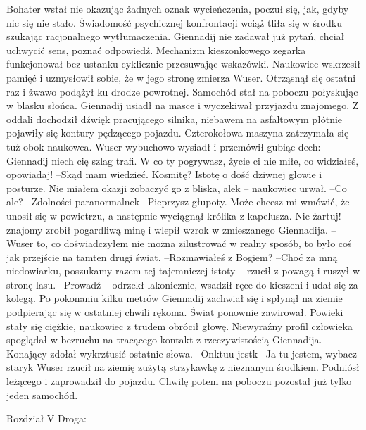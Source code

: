 \documentclass[../MAIN.tex]{subfiles}
\begin{document}
Bohater wstał nie okazując żadnych oznak wycieńczenia, poczuł się, jak, gdyby nic się nie stało. Świadomość psychicznej konfrontacji wciąż tliła się w środku szukając racjonalnego wytłumaczenia. Giennadij nie zadawał już pytań, chciał uchwycić sens, poznać odpowiedź. Mechanizm kieszonkowego zegarka funkcjonował bez ustanku cyklicznie przesuwając wskazówki. Naukowiec wskrzesił pamięć 
i uzmysłowił sobie, że w jego stronę zmierza Wuser. Otrząsnął się ostatni raz i żwawo podążył ku drodze powrotnej. Samochód stał na poboczu połyskując w blasku słońca. Giennadij usiadł na masce i wyczekiwał przyjazdu znajomego. Z oddali dochodził dźwięk pracującego silnika, niebawem na asfaltowym płótnie pojawiły się kontury pędzącego pojazdu. Czterokołowa maszyna zatrzymała się tuż obok naukowca. Wuser wybuchowo wysiadł i przemówił gubiąc dech: 
--Giennadij niech cię szlag trafi. W co ty pogrywasz, życie ci nie miłe, co widziałeś, opowiadaj! 
--Skąd mam wiedzieć. Kosmitę? Istotę o dość dziwnej głowie i posturze. Nie miałem okazji zobaczyć go z bliska, ale\3k -- naukowiec urwał. 
--Co ale? 
--Zdolności paranormalne\3k 
--Pieprzysz głupoty. Może chcesz mi wmówić, że unosił się w powietrzu, a następnie wyciągnął królika z kapelusza. Nie żartuj! -- znajomy zrobił pogardliwą minę i wlepił wzrok w zmieszanego Giennadija. 
--Wuser to, co doświadczyłem nie można zilustrować w realny sposób, to było coś jak przejście na tamten drugi świat. 
--Rozmawiałeś z Bogiem? 
--Choć za mną niedowiarku, poszukamy razem tej tajemniczej istoty -- rzucił z powagą i ruszył w stronę lasu. 
--Prowadź -- odrzekł lakonicznie, wsadził ręce do kieszeni i udał się za kolegą. 
Po pokonaniu kilku metrów Giennadij zachwiał się i spłynął na ziemie podpierając się w ostatniej chwili rękoma. Świat ponownie zawirował. Powieki stały się ciężkie, naukowiec z trudem obrócił głowę. Niewyraźny profil człowieka spoglądał w bezruchu na tracącego kontakt z rzeczywistością Giennadija. Konający zdołał wykrztusić ostatnie słowa. 
--On\3ktuu jest\3k 
--Ja tu jestem, wybacz stary\3k 
Wuser rzucił na ziemię zużytą strzykawkę z nieznanym środkiem. Podniósł leżącego i zaprowadził do pojazdu. Chwilę potem na poboczu pozostał już tylko jeden samochód.


Rozdział V
Droga:  
\end{document}
